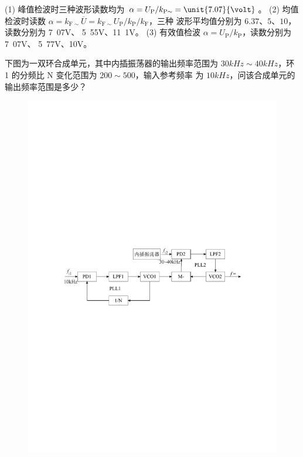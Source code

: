\documentclass[a4paper,12pt]{examdesign}
\begin{document}
\begin{shortanswer}[title={二、计算题 (每题 10 分，共 80 分)}]
\begin{question}
\begin{answer}
        (1) 峰值检波时三种波形读数均为 $\alpha =
        U_\mathrm{P}/k_\mathrm{P\sim} = \unit{7.07}{\volt}$。
        (2) 均值检波时读数 $\alpha = k_\mathrm{F\sim}\overline{U} =
        k_\mathrm{F\sim}U_\mathrm{P}/k_\mathrm{P}/k_\mathrm{F}$，三种
    波形平均值分别为 $6.37$、$5$、$10$，读数分别为 \unit{7.07}{V}、
    \unit{5.55}{V}、\unit{11.1}{V}。
       (3) 有效值检波 $\alpha = U_\mathrm{P}/k_\mathrm{P}$，读数分别为
       \unit{7.07}{V}、 \unit{5.77}{V}、\unit{10}{V}。
    \end{answer}
\end{question}
\begin{question}
    下图为一双环合成单元，其中内插振荡器的输出频率范围为 $\unit{30}{kHz}
    \sim\unit{40}{kHz}$，环 1 的分频比 N 变化范围为 $200\sim 500$，输入参考频率
    为 $\unit{10}{kHz}$，问该合成单元的输出频率范围是多少？
    \begin{figure}[H]
        \centering
        \includegraphics{pll}

\end{figure}
\end{question}
\end{shortanswer}
\end{document}
